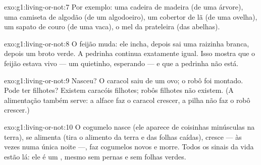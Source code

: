 \begin{solution}{exo:g1:living-or-not:7}
Por exemplo: uma cadeira de madeira (de uma árvore), uma camiseta de
algodão (de um algodoeiro), um cobertor de lã (de uma ovelha), um
sapato de couro (de uma vaca), o mel da prateleira (das abelhas).
\end{solution}

\begin{solution}{exo:g1:living-or-not:8}
O feijão muda: ele incha, depois sai uma raizinha branca, depois um
broto verde. A pedrinha continua exatamente igual. Isso mostra que o
feijão estava vivo --- um  quietinho, esperando --- e que a
pedrinha não está.
\end{solution}

\begin{solution}{exo:g1:living-or-not:9}
Nasceu? O caracol saiu de um ovo; o robô foi montado. Pode ter
filhotes? Existem caracóis filhotes; robôs filhotes não existem.
(A alimentação também serve: a alface faz o caracol crescer, a pilha
não faz o robô crescer.)
\end{solution}

\begin{solution}{exo:g1:living-or-not:10}
O cogumelo nasce (ele aparece de coisinhas minúsculas na terra), se
alimenta (tira o alimento da terra e das folhas caídas), cresce ---
às vezes numa única noite ---, faz cogumelos novos e morre. Todos os
sinais da vida estão lá: ele é um , mesmo sem pernas e sem
folhas verdes.
\end{solution}
